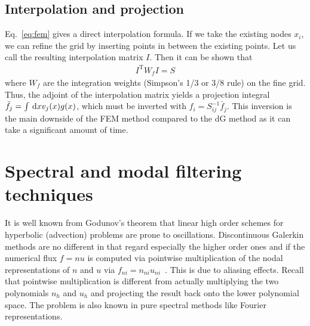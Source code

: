 \subsection{Interpolation and projection}
Eq.~\eqref{eq:fem} gives a direct interpolation formula. If we take the existing
nodes $x_i$, we can refine the grid by inserting points in between the existing points.
Let us call the resulting interpolation matrix $I$. Then
it can be shown that
\begin{align}
    I^\mathrm{T} W_f I = S
\end{align}
where $W_f$ are the integration weights (Simpson's 1/3 or 3/8 rule) on the fine grid.
Thus, the adjoint of the interpolation matrix yields a projection integral $\bar f_j = \int \,\mathrm{d}x v_j(x) g(x)$, which must be inverted with $f_i = S_{ij}^{-1} \bar f_j$.
This inversion is the main downside of the FEM method compared to the dG method
as it can take a significant amount of time.


\section{Spectral and modal filtering techniques}
It is well known from Godunov's theorem that linear high order schemes for hyperbolic (advection) problems
are prone to oscillations. Discontinuous Galerkin methods are no different in that regard
especially the higher order ones and if the numerical flux $f=nu$ is computed via pointwise multiplication
of the nodal representations of $n$ and $u$ via $f_{ni} = n_{ni} u_{ni}$~\cite{NodalDG}.
This is due to aliasing effects. Recall that pointwise multiplication is different from
actually multiplying the two polynomials $n_h$ and $u_h$ and projecting the result back onto the
lower polynomial space. The problem is also known in pure spectral methods like
Fourier representations.

